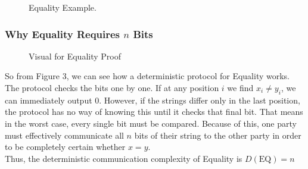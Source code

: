 \begin{figure}[h]
\centering
{}
\caption{Equality Example.}
\end{figure}

\subsubsection*{Why Equality Requires $n$ Bits}



\begin{figure}[H]
\centering
{}
\caption {Visual for Equality Proof}
\end{figure}


So from Figure 3, we can see how a deterministic protocol for Equality works.
The protocol checks the bits one by one. If at any position $i$ we find 
$x_i \neq y_i$, we can immediately output $0$. However, if the strings differ only in the last position, the protocol  has no way of knowing this until it checks that final bit. That means in the worst case, every single bit must be compared. Because of this, one party must effectively communicate all $n$ bits of their string to the other party in order to be completely certain whether $x = y$.\\

Thus, the deterministic communication complexity of Equality is $D(\text{EQ}) = n$


